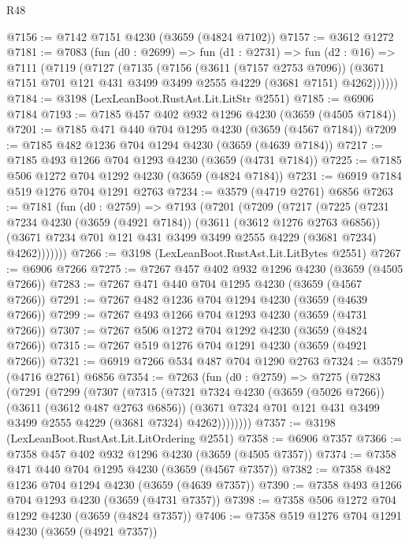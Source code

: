 \begin{lexlean}{R48}
\begin{coremodule}
@7156 := @7142 @7151 @4230 (@3659 (@4824 @7102))
@7157 := @3612 @1272
@7181 := @7083
    (fun (d0 : @2699) =>
    fun (d1 : @2731) =>
    fun (d2 : @16) =>
    @7111
      (@7119
        (@7127
          (@7135
            (@7156
              (@3611 (@7157 @2753 @7096))
              (@3671 @7151 @701 @121 @431 @3499 @3499 @2555 @4229 (@3681 @7151) @4262))))))
@7184 := @3198 (LexLeanBoot.RustAst.Lit.LitStr @2551)
@7185 := @6906 @7184
@7193 := @7185 @457 @402 @932 @1296 @4230 (@3659 (@4505 @7184))
@7201 := @7185 @471 @440 @704 @1295 @4230 (@3659 (@4567 @7184))
@7209 := @7185 @482 @1236 @704 @1294 @4230 (@3659 (@4639 @7184))
@7217 := @7185 @493 @1266 @704 @1293 @4230 (@3659 (@4731 @7184))
@7225 := @7185 @506 @1272 @704 @1292 @4230 (@3659 (@4824 @7184))
@7231 := @6919 @7184 @519 @1276 @704 @1291 @2763
@7234 := @3579 (@4719 @2761) @6856
@7263 := @7181
    (fun (d0 : @2759) =>
    @7193
      (@7201
        (@7209
          (@7217
            (@7225
              (@7231
                @7234
                @4230
                (@3659 (@4921 @7184))
                (@3611 (@3612 @1276 @2763 @6856))
                (@3671 @7234 @701 @121 @431 @3499 @3499 @2555 @4229 (@3681 @7234) @4262)))))))
@7266 := @3198 (LexLeanBoot.RustAst.Lit.LitBytes @2551)
@7267 := @6906 @7266
@7275 := @7267 @457 @402 @932 @1296 @4230 (@3659 (@4505 @7266))
@7283 := @7267 @471 @440 @704 @1295 @4230 (@3659 (@4567 @7266))
@7291 := @7267 @482 @1236 @704 @1294 @4230 (@3659 (@4639 @7266))
@7299 := @7267 @493 @1266 @704 @1293 @4230 (@3659 (@4731 @7266))
@7307 := @7267 @506 @1272 @704 @1292 @4230 (@3659 (@4824 @7266))
@7315 := @7267 @519 @1276 @704 @1291 @4230 (@3659 (@4921 @7266))
@7321 := @6919 @7266 @534 @487 @704 @1290 @2763
@7324 := @3579 (@4716 @2761) @6856
@7354 := @7263
    (fun (d0 : @2759) =>
    @7275
      (@7283
        (@7291
          (@7299
            (@7307
              (@7315
                (@7321
                  @7324
                  @4230
                  (@3659 (@5026 @7266))
                  (@3611 (@3612 @487 @2763 @6856))
                  (@3671 @7324 @701 @121 @431 @3499 @3499 @2555 @4229 (@3681 @7324) @4262))))))))
@7357 := @3198 (LexLeanBoot.RustAst.Lit.LitOrdering @2551)
@7358 := @6906 @7357
@7366 := @7358 @457 @402 @932 @1296 @4230 (@3659 (@4505 @7357))
@7374 := @7358 @471 @440 @704 @1295 @4230 (@3659 (@4567 @7357))
@7382 := @7358 @482 @1236 @704 @1294 @4230 (@3659 (@4639 @7357))
@7390 := @7358 @493 @1266 @704 @1293 @4230 (@3659 (@4731 @7357))
@7398 := @7358 @506 @1272 @704 @1292 @4230 (@3659 (@4824 @7357))
@7406 := @7358 @519 @1276 @704 @1291 @4230 (@3659 (@4921 @7357))

\end{coremodule}
\end{lexlean}
